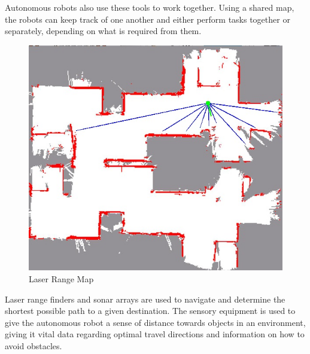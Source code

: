 Autonomous robots also use these tools to work together. Using a shared map, the robots can keep track of one another and either perform tasks together or separately, depending on what is required from them.

\begin{figure}[H]
	\centering
	\includegraphics[scale=.7]{images/laserrangemap.jpg}
	\caption{Laser Range Map\cite{laserrangepic}}
	\label{fig:laserrangemap}
\end{figure}

Laser range finders and sonar arrays are used to navigate and determine the shortest possible path to a given destination. The sensory equipment is used to give the autonomous robot a sense of distance towards objects in an environment, giving it vital data regarding optimal travel directions and information on how to avoid obstacles\cite{lasersonar}.






